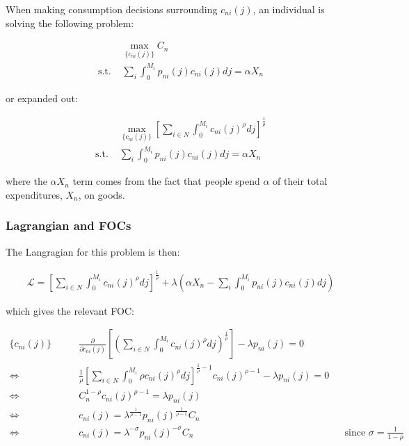 \documentclass[10pt]{article}
\begin{document}
When making consumption decisions surrounding
$c_{n i}(j)$, an individual is solving the following problem:

\begin{align}
    &\underset{\{c_{n i}(j)\}}{\max} C_n \\ 
    \text{s.t. } &\sum_i \int_{0}^{M_i} p_{n i}(j) c_{n i}(j) d j=\alpha X_n
\end{align}

or expanded out:

\begin{align}
    &\underset{\{c_{n i}(j)\}}{\max} \left[\sum_{i \in N} \int_0^{M_i} c_{n i}(j)^\rho d j\right]^{\frac{1}{\rho}} \\
    \text{s.t. } &\sum_i \int_{0}^{M_i} p_{n i}(j) c_{n i}(j) d j=\alpha X_n
\end{align}

where the $\alpha X_n$ term comes from the fact that 
people spend $\alpha$ of their total expenditures, $X_n$,
on goods.

\subsubsection{Lagrangian and FOCs}

The Langragian for this problem is then:

\begin{align}
    \mathcal{L} = \left[\sum_{i \in N} \int_0^{M_i} c_{n i}(j)^\rho d j\right]^{\frac{1}{\rho}} + \lambda \left(\alpha X_n - \sum_i \int_{0}^{M_i} p_{n i}(j) c_{n i}(j) d j\right)
\end{align}

which gives the relevant FOC:

\begin{align}
    \{c_{n i}(j)\} \quad \quad &\frac{\partial}{\partial c_{n i}(j)} \left[\left(\sum_{i \in N} \int_0^{M_i} c_{n i}(j)^\rho d j\right)^{\frac{1}{\rho}}\right] - \lambda p_{n i}(j) = 0 \\
    \Leftrightarrow & \frac{1}{\rho} \left[\sum_{i \in N} \int_0^{M_i} \rho c_{n i}(j)^\rho d j\right]^{\frac{1}{\rho}-1} c_{n i}(j)^{\rho-1} - \lambda p_{n i}(j) = 0 \\
    \Leftrightarrow & C_n^{1-\rho} c_{n i}(j)^{\rho-1} = \lambda p_{n i}(j) \\
    \Leftrightarrow & c_{n i}(j) = \lambda^{\frac{1}{\rho -1}} p_{ni}(j)^{\frac{1}{\rho -1}} C_n \\ 
    \Leftrightarrow & c_{n i}(j) = \lambda^{-\sigma} p_{ni}(j)^{-\sigma} C_n && \text{since $\sigma = \frac{1}{1-\rho}$} \label{eq:inter_good_nij_cons}
\end{align}
\end{document}
